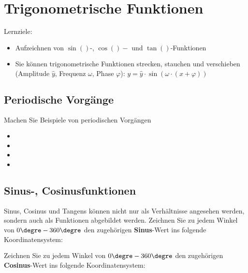 
\section{Trigonometrische
  Funktionen}

Lernziele:
\begin{itemize}
\item Aufzeichnen von $\sin()$-, $\cos()-$ und $\tan()$-Funktionen
\item Sie können trigonometrische Funktionen strecken, stauchen und
  verschieben (Amplitude $\hat{y}$, Frequenz $\omega$, Phase
  $\varphi$): $y=\hat{y}\cdot{}\sin(\omega\cdot{}(x+\varphi))$
\end{itemize}


\subsection{Periodische Vorgänge}
Machen Sie Beispiele von periodischen Vorgängen
\begin{itemize}
  \item {}
  \item {}
  \item {}
  \item {}
\end{itemize}
\newpage

\subsection{Sinus-, Cosinusfunktionen}
Sinus, Cosinus und Tangens können nicht nur als Verhältnisse angesehen
werden, sondern auch als Funktionen abgebildet werden.
Zeichnen Sie zu jedem Winkel von $0\degre - 360\degre$ den zugehörigen
\textbf{Sinus}-Wert ins folgende Koordinatensystem:



Zeichnen Sie zu jedem Winkel von $0\degre - 360\degre$ den zugehörigen
\textbf{Cosinus}-Wert ins folgende Koordinatensystem:

